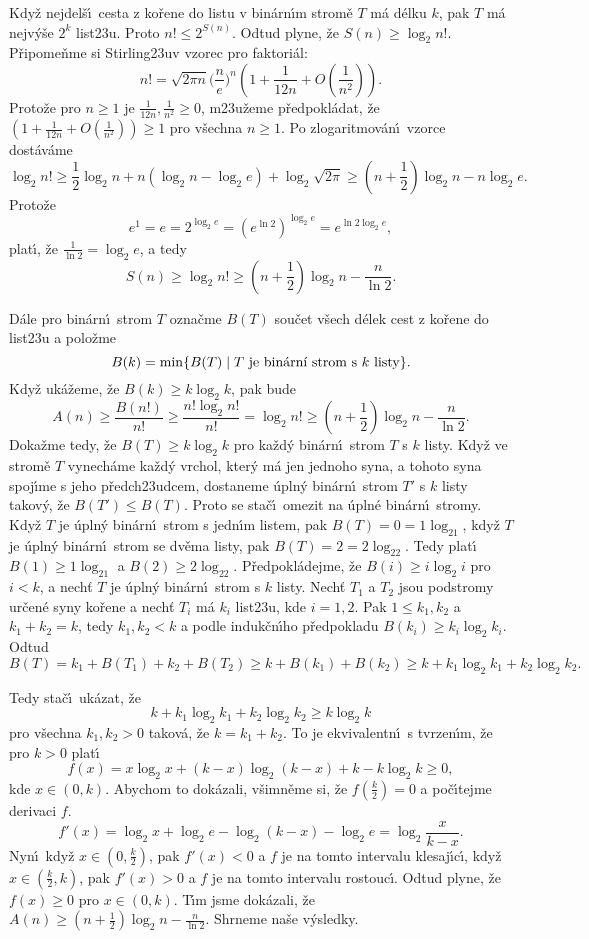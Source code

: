\flushpar Kdy\v z nejdel\v s\'\i\ cesta z ko\v rene do listu v 
bin\'arn\'\i m strom\v e $T$ m\'a d\'elku $k$, pak $T$ m\'a nejv\'y\v se $
2^k$ 
list\accent23u. Proto $n!\le 2^{S(n)}$. Odtud plyne, \v ze $S(n)\ge\log_
2n!$.
P\v ripome\v nme si Stirling\accent23uv vzorec pro faktori\'al: 
$$n!=\sqrt {2\pi n}\big(\frac ne\big)^n(1+\frac 1{12n}+O(\frac 1{
n^2})).$$
Proto\v ze pro $n\ge 1$ je $\frac 1{12n},\frac 1{n^2}\ge 0$, m\accent23u\v zeme 
p\v redpokl\'adat, \v ze $(1+\frac 1{12n}+O(\frac 1{n^2}))\ge 1$ pro v\v sechna $
n\ge 1$. Po 
zlogaritmov\'an\'\i\ vzorce dost\'av\'ame 
$$\log_2n!\ge\frac 12\log_2n+n(\log_2n-\log_2e)+\log_2\sqrt {2\pi}
\ge (n+\frac 12)\log_2n-n\log_2e.$$
Proto\v ze  
$$e^1=e=2^{\log_2e}=(e^{\ln2})^{\log_2e}=e^{\ln2\log_2e},$$
plat\'\i , \v ze $\frac 1{\ln2}=\log_2e$, a tedy  
$$S(n)\ge\log_2n!\ge (n+\frac 12)\log_2n-\frac n{\ln2}.$$
\medskip

\flushpar D\'ale pro bin\'arn\'\i\ strom $T$ ozna\v cme $B(T)$ sou\v cet v\v sech 
d\'elek cest z ko\v rene do list\accent23u a polo\v zme 
$$B(k)=\min\{B(T)\mid T\text{\rm\ je bin\'arn\'\i\ strom s $k$ listy}
\}.$$
Kdy\v z uk\'a\v zeme, \v ze $B(k)\ge k\log_2k$, pak bude 
$$A(n)\ge\frac {B(n!)}{n!}\ge\frac {n!\log_2n!}{n!}=\log_2n!\ge (
n+\frac 12)\log_2n-\frac n{\ln2}.$$
Doka\v zme tedy, \v ze $B(T)\ge k\log_2k$ pro ka\v zd\'y bin\'arn\'\i\ 
strom $T$ s $k$ listy. Kdy\v z ve strom\v e $T$ vynech\'ame ka\v zd\'y 
vrchol, kter\'y m\'a jen jednoho syna, a tohoto syna spoj\'\i me 
s jeho p\v redch\accent23udcem, dostaneme \'upln\'y bin\'arn\'\i\ 
strom $T'$ s $k$ listy tako\-v\'y, \v ze $B(T')\le B(T)$. Proto se sta\v c\'\i\  
omezit na \'upln\'e bin\'arn\'\i\ stromy. Kdy\v z $T$ je \'upln\'y 
bin\'arn\'\i\ strom s jedn\'\i m listem, pak $B(T)=0=1\log_21$, 
kdy\v z $T$ je \'upln\'y bin\'arn\'\i\ strom se dv\v ema listy, pak 
$B(T)=2=2\log_22$. Tedy plat\'\i\ $B(1)\ge 1\log_21$ a $B(2)\ge 2\log_
22$. 
P\v redpokl\'adejme, \v ze $B(i)\ge i\log_2i$ pro $i<k$, a nech\v t $
T$ je 
\'upln\'y bin\'arn\'\i\ strom s $k$ listy. Nech\v t $T_1$ a $T_2$ jsou 
podstromy ur\v cen\'e syny ko\v rene a nech\v t $T_i$ m\'a $k_i$ 
list\accent23u, kde $i=1,2$. Pak $1\le k_1,k_2$ a $k_1+k_2=k$, tedy 
$k_1,k_2<k$ a podle induk\v cn\'\i ho p\v redpokladu $B(k_i)\ge k_
i\log_2k_i$. 
Odtud 
$$B(T)=k_1+B(T_1)+k_2+B(T_2)\ge k+B(k_1)+B(k_2)\ge k+k_1\log_2k_1
+k_2\log_2k_2.$$
\medskip

\flushpar Tedy sta\v c\'\i\ uk\'azat, \v ze 
$$k+k_1\log_2k_1+k_2\log_2k_2\ge k\log_2k$$
pro v\v sechna $k_1,k_2>0$ takov\'a, \v ze $k=k_1+k_2$. To je 
ekvivalentn\'\i\ s tvrzen\'\i m, \v ze pro $k>0$ plat\'\i\ 
$$f(x)=x\log_2x+(k-x)\log_2(k-x)+k-k\log_2k\ge 0,$$
kde $x\in (0,k)$. 
Abychom to dok\'azali, v\v simn\v eme si, \v ze $f(\frac k2)=0$ a  
po\v c\'\i\-tejme derivaci $f$.
$$f'(x)=\log_2x+\log_2e-\log_2(k-x)-\log_2e=\log_2\frac x{k-x}.$$
Nyn\'\i\ kdy\v z $x\in (0,\frac k2)$, pak $f'(x)<0$ a $f$ je na tomto intervalu 
klesaj\'\i c\'\i , kdy\v z $x\in (\frac k2,k)$, pak $f'(x)>0$ a $
f$ je na tomto 
intervalu rostouc\'\i . Odtud plyne, \v ze $f(x)\ge 0$ pro $x\in 
(0,k)$.
T\'\i m jsme dok\'azali, \v ze $A(n)\ge (n+\frac 12)\log_2n-\frac 
n{\ln2}$. Shrneme 
na\v se v\'ysledky.
\medskip

